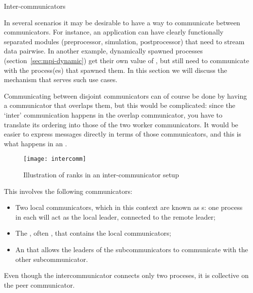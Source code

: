 
 {Inter-communicators}
\label{sec:mpi-intercomm}

In several scenarios it may be desirable to have a way to communicate
between communicators. For instance, an application can have clearly
functionally separated modules (preprocessor, simulation,
postprocessor) that need to stream data pairwise. In another example,
dynamically spawned processes (section~\ref{sec:mpi-dynamic}) get
their own value of , but still need to
communicate with the process(es) that spawned them. In this section we
will discuss the  mechanism that
serves such use cases.

Communicating between disjoint communicators can of course be done by
having a
communicator that overlaps them, but this would be complicated: since
the `inter' communication happens in the overlap communicator, you
have to translate its ordering into those of the two worker
communicators. It would be easier to express messages directly in
terms of those communicators, and this is what happens in an
.

\begin{figure}[ht]
  \texttt{[image: intercomm]}
  \caption{Illustration of ranks in an inter-communicator setup}
  \label{fig:intercomm}
\end{figure}


This involves the following communicators:
\begin{itemize}
\item Two local communicators, which in this context are known as
  s: one process in each will act as
  the local leader, connected to the remote leader;
\item The , often
  , that contains the local
  communicators;
\item An  that allows the leaders
  of the subcommunicators to communicate with the other subcommunicator.
\end{itemize}
Even though the intercommunicator connects only two proceses, it is
collective on the peer communicator.

